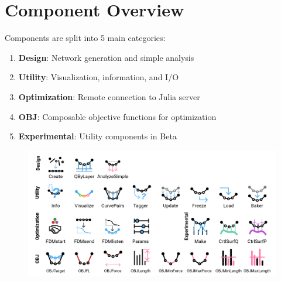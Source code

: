 \documentclass{ol-softwaremanual}
\begin{document}
\section{Component Overview} \label{sec:components}
Components are split into 5 main categories:
\begin{enumerate}
    \item \textbf{Design}: Network generation and simple analysis
    \item \textbf{Utility}: Visualization, information, and I/O
    \item \textbf{Optimization}: Remote connection to Julia server
    \item \textbf{OBJ}: Composable objective functions for optimization
    \item \textbf{Experimental}: Utility components in Beta
\end{enumerate}
\begin{figure}[h]
    \centering
    \includegraphics*[width=\textwidth]{Figures/overview}
\end{figure}


\end{document}
